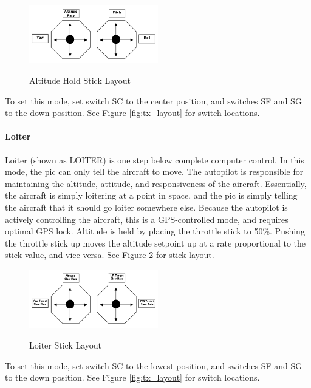 \documentclass{report}
\begin{document}
					\begin{figure}[ht]
						\centering
						\caption{Altitude Hold Stick Layout}
						\includegraphics[width=0.5\textwidth]{althold_stick_layout.png}
						\label{fig:alt_hold_sticks}
					\end{figure}

					To set this mode, set switch SC to the center position, and switches SF and SG to the down position.  See Figure \ref{fig:tx_layout} for switch locations.
				\paragraph{Loiter}
					Loiter (shown as LOITER) is one step below complete computer control.  In this mode, the \gls{pic} can only tell the aircraft to move.  The autopilot is responsible for maintaining the altitude, attitude, and responsiveness of the aircraft.  Essentially, the aircraft is simply loitering at a point in space, and the \gls{pic} is simply telling the aircraft that it should go loiter somewhere else.  Because the autopilot is actively controlling the aircraft, this is a GPS-controlled mode, and requires optimal GPS lock.  Altitude is held by placing the throttle stick to 50\%.  Pushing the throttle stick up moves the altitude setpoint up at a rate proportional to the stick value, and vice versa.  See Figure \ref{fig:loiter_sticks} for stick layout.

					\begin{figure}[ht]
						\centering
						\caption{Loiter Stick Layout}
						\includegraphics[width=0.5\textwidth]{loiter_stick_layout.png}
						\label{fig:loiter_sticks}
					\end{figure}

					To set this mode, set switch SC to the lowest position, and switches SF and SG to the down position.  See Figure \ref{fig:tx_layout} for switch locations.
\end{document}
